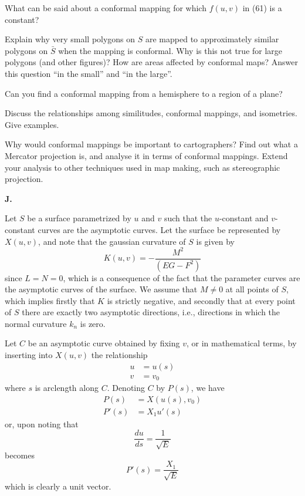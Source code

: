 \documentclass{book}
\begin{document}
What can be said about a conformal mapping for which $f(u,v)$ in (61) is a constant? 

Explain why very small polygons on $S$ are mapped to approximately similar polygons on $\bar{S}$ when the mapping is conformal. Why is this not true for large polygons (and other figures)? How are areas affected by conformal maps? Answer this question ``in the small'' and ``in the large''.

Can you find a conformal mapping from a hemisphere to a region of a plane?

Discuss the relationships among similitudes, conformal mappings, and isometries. Give examples.

Why would conformal mappings be important to cartographers? Find out what a Mercator projection is, and analyse it in terms of conformal mappings. Extend your analysis to other techniques used in map making, such as stereographic projection.

\vspace{0.3cm}

\noindent \textbf{J.}

\vspace{0.3cm}

Let $S$ be a surface parametrized by $u$ and $v$ such that the $u$-constant and $v$-constant curves are the asymptotic curves. Let the surface be represented by $X(u,v)$, and note that the gaussian curvature of $S$ is given by
\begin{equation}
K(u,v) = - \frac{M^{2}}{(EG - F^{2})}
\end{equation}
since $L = N = 0$, which is a consequence of the fact that the parameter curves are the asymptotic curves of the surface. We assume that $M \neq 0$ at all points of $S$, which implies firstly that $K$ is strictly negative, and secondly that at every point of $S$ there are exactly two asymptotic directions, i.e., directions in which the normal curvature $k_{n}$ is zero.

Let $C$ be an asymptotic curve obtained by fixing $v$, or in mathematical terms, by inserting into $X(u,v)$ the relationship
\begin{align}
u & = u(s) \\
v & = v_{0}
\end{align}
where $s$ is arclength along $C$. Denoting $C$ by $P(s)$, we have
\begin{align}
P(s) & = X(u(s), v_{0}) \\
P'(s) & = X_{1}u'(s)
\end{align}
or, upon noting that
\begin{equation}
\frac{du}{ds} = \frac{1}{\sqrt{E}}
\end{equation}
becomes
\begin{equation}
P'(s) = \frac{X_{1}}{\sqrt{E}}
\end{equation}
which is clearly a unit vector. 
\end{document}
